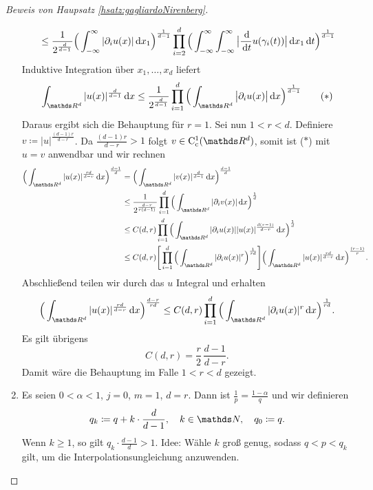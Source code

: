 \begin{proof}[Beweis von Haupsatz \ref{hsatz:gagliardoNirenberg}]
\begin{enumerate}
\begin{align*}
      &\quad \leq \frac{1}{2^{\frac{d}{d - 1}}} \Big( \int_{-\infty}^\infty |\partial_i u(x)| \, {\operatorname{d}\!{x}}_1 \Big)^{\frac{1}{d - 1}} \prod_{i = 2}^d \Big(\int_{-\infty}^\infty \int_{-\infty}^\infty \big| \frac{\, {\operatorname{d}\!{}}}{\, {\operatorname{d}\!{t}}} u(\gamma_i(t)) \big| \, {\operatorname{d}\!{x}}_1 \, {\operatorname{d}\!{t}} \Big)^{\frac{1}{d - 1}}
      \end{align*}
      Induktive Integration über $x_1,\dots,x_d$ liefert
      \begin{align*}
        \int_{\R^d} |u(x)|^{\frac{d}{d - 1}} \d x \leq \frac{1}{2^{\frac{d}{d - 1}}} \prod_{i = 1}^d \Big( \int_{\R^d} \big|\partial_i u(x) \big| \d x \Big)^{\frac{1}{d - 1}} \tag{$\ast$}
      \end{align*}
      Daraus ergibt sich die Behauptung für $r = 1$.
      Sei nun $1 < r < d$. 
      Definiere $v \coloneqq |u|^{\frac{(d - 1) r}{d - r}}$.
      Da $\frac{(d - 1)r}{d - r} > 1$ folgt $v \in \CC_{\mathrm{c}}^1(\R^d)$, somit ist ($\ast$) mit $u = v$ anwendbar und wir rechnen
      \begin{align*}
        \Big( \int_{\R^d} |u(x)|^{\frac{rd}{d - r}} \d x \Big)^{\frac{d - 1}{d} }
       &= \Big( \int_{\R^d} |v(x)|^{\frac{d}{d - 1}} \d x \Big)^{ \frac{d - 1}{d}} \\
        &\leq \frac{1}{2^{\frac{d - r}{r(d - 1)}}} \prod_{i = 1}^d \Big( \int_{\R^d} |\partial_i v(x) | \d x \Big)^{\frac{1}{d}} \\
        &\leq C(d,r) \prod_{i = 1}^d \Big( \int_{\R^d} |\partial_i u(x)| |u(x)|^{\frac{d (r - 1)}{d - r}} \d x \Big)^{\frac{1}{d}} \\
        &\leq C(d,r) \Bigg[ \prod_{i = 1}^d \Big( \int_{\R^d} |\partial_i u(x)|^r \Big)^{\frac{1}{r d}} \Bigg] \Big( \int_{\R^d} |u(x)|^{\frac{rd}{d - r}} \d x \Big)^{\frac{(r - 1)}{r}}.
      \end{align*}
      Abschließend teilen wir durch das $u$ Integral und erhalten
      $$
      \Big( \int_{\R^d} |u(x)|^{\frac{rd}{d - r}} \d x \Big)^{\frac{d - r}{rd}} \leq C(d,r) \prod_{i = 1}^d \Big( \int_{\R^d} |\partial_i u(x)|^r \d x \Big)^{\frac{1}{rd}}.
      $$
      Es gilt übrigens
      $$
      C(d,r) = \frac{r}{2} \, \frac{d - 1}{d - r}.
      $$
      Damit wäre die Behauptung im Falle $1 < r < d$ gezeigt.
    \item 
      Es seien $0 < \alpha < 1$, $j = 0$, $m = 1$, $d = r$.
      Dann ist $ \frac{1}{p} = \frac{1 - \alpha}{q} $ und wir definieren
      $$
      q_k \coloneqq q + k \cdot \frac{d}{d - 1}, \quad k \in \N, \quad q_0 \coloneqq q.
      $$
      Wenn $k \geq 1$, so gilt $q_k \cdot \frac{d - 1}{d} > 1$.
      Idee: Wähle $k$ groß genug, sodass $q < p < q_k$ gilt, um die Interpolationsungleichung anzuwenden.

\end{enumerate}
\end{proof}
